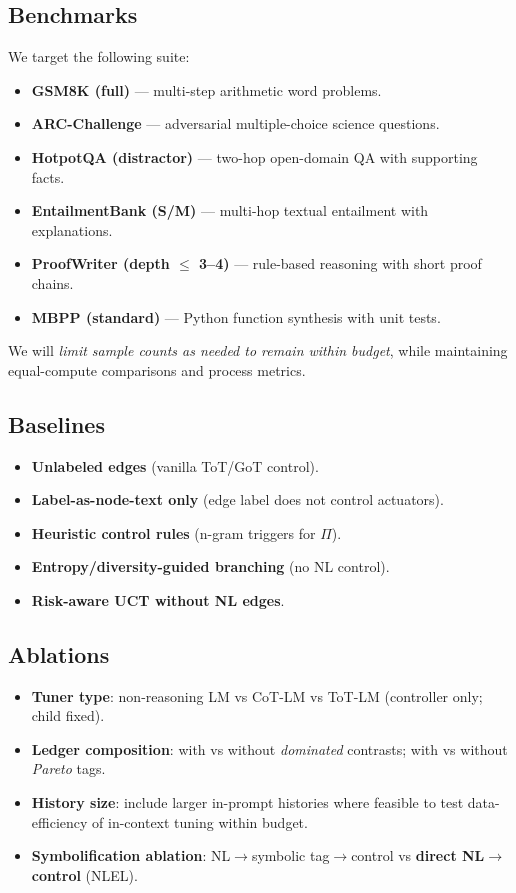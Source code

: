 \documentclass[11pt]{article}
\begin{document}
\subsection{Benchmarks}
We target the following suite:
\begin{itemize}[leftmargin=1.2em]
  \item \textbf{GSM8K (full)} --- multi-step arithmetic word problems.
  \item \textbf{ARC-Challenge} --- adversarial multiple-choice science questions.
  \item \textbf{HotpotQA (distractor)} --- two-hop open-domain QA with supporting facts.
  \item \textbf{EntailmentBank (S/M)} --- multi-hop textual entailment with explanations.
  \item \textbf{ProofWriter (depth $\le$ 3--4)} --- rule-based reasoning with short proof chains.
  \item \textbf{MBPP (standard)} --- Python function synthesis with unit tests.
\end{itemize}
We will \emph{limit sample counts as needed to remain within budget}, while maintaining equal-compute comparisons and process metrics.

\subsection{Baselines}
\begin{itemize}[leftmargin=1.2em]
  \item \textbf{Unlabeled edges} (vanilla ToT/GoT control).
  \item \textbf{Label-as-node-text only} (edge label does not control actuators).
  \item \textbf{Heuristic control rules} (n-gram triggers for $\Pi$).
  \item \textbf{Entropy/diversity-guided branching} (no NL control).
  \item \textbf{Risk-aware UCT without NL edges}.
\end{itemize}

\subsection{Ablations}
\begin{itemize}[leftmargin=1.2em]
  \item \textbf{Tuner type}: non-reasoning LM vs CoT-LM vs ToT-LM (controller only; child fixed).
  \item \textbf{Ledger composition}: with vs without \emph{dominated} contrasts; with vs without \emph{Pareto} tags.
  \item \textbf{History size}: include larger in-prompt histories where feasible to test data-efficiency of in-context tuning within budget.
  \item \textbf{Symbolification ablation}: NL$\to$symbolic tag$\to$control vs \textbf{direct NL$\to$control} (NLEL).
\end{itemize}
\end{document}
